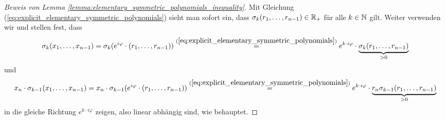 \begin{proof}[Beweis von Lemma \ref{lemma:elementary_symmetric_polynomials_inequality}]
    \noindent Mit Gleichung
    (\ref{eq:explicit_elementary_symmetric_polynomials})
    sieht man sofort ein, dass
    $\sigma_k(r_1, \dots, r_{n-1}) \in \mathbb{R}_{+}$ für alle $k \in \mathbb{N}$ gilt.
    Weiter verwenden wir
    und stellen fest, dass
    \begin{equation*}
        \sigma_{k}(x_1, \dots, x_{n-1})
        = \sigma_k(e^{i \varphi} \cdot (r_1, \dots, r_{n-1}))
        \overset{(\ref{eq:explicit_elementary_symmetric_polynomials})}{=}
            e^{k \cdot i \varphi} \cdot \underbrace{\sigma_k(r_1, \dots, r_{n-1})}_{> 0}
    \end{equation*}
    und
    \begin{equation*}
        x_n \cdot \sigma_{k-1}(x_1, \dots, x_{n-1})
        = x_n \cdot \sigma_{k-1}(e^{i \varphi} \cdot (r_1, \dots, r_{n-1}))
        \overset{(\ref{eq:explicit_elementary_symmetric_polynomials})}{=}
            e^{k \cdot i \varphi} \cdot \underbrace{r_n \sigma_{k-1}(r_1, \dots, r_{n-1})}_{> 0}
    \end{equation*}
    \enlargethispage{2em}
    in die gleiche Richtung $e^{k\cdot i\varphi}$ zeigen, also linear abhängig
    sind, wie behauptet.
\end{proof}
